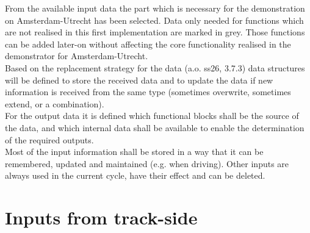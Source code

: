 \documentclass{template/openetcs_report}
\begin{document}
From the available input data the part which is necessary for the demonstration on Amsterdam-Utrecht has been selected. Data only needed for functions which are not realised in this first implementation are marked in grey. Those functions can be added later-on without affecting the core functionality realised in the demonstrator for Amsterdam-Utrecht.\\

Based on the replacement strategy for the data (a.o. ss26, 3.7.3) data structures will be defined to store the received data and to update the data if new information is received from the same type (sometimes overwrite, sometimes extend, or a combination).\\

For the output data it is defined which functional blocks shall be the source of the data, and which internal data shall be available to enable the determination of the required outputs.\\

Most of the input information shall be stored in a way that it can be remembered, updated and maintained (e.g. when driving). Other inputs are always used in the current cycle, have their effect and can be deleted.\\

\section{Inputs from track-side}
\end{document}
